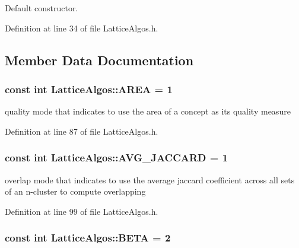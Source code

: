 Default constructor. 



Definition at line 34 of file LatticeAlgos.h.



\subsection{Member Data Documentation}
\hypertarget{class_lattice_algos_a0a79ddaab00906dea5756ac05a4861a5}{
\subsubsection[{AREA}]{\setlength{\rightskip}{0pt plus 5cm}const int {\bf LatticeAlgos::AREA} = 1}}
\label{class_lattice_algos_a0a79ddaab00906dea5756ac05a4861a5}


quality mode that indicates to use the area of a concept as its quality measure 



Definition at line 87 of file LatticeAlgos.h.

\hypertarget{class_lattice_algos_a24156b300d4b23d0d618f548091d0aeb}{
\subsubsection[{AVG\_\-JACCARD}]{\setlength{\rightskip}{0pt plus 5cm}const int {\bf LatticeAlgos::AVG\_\-JACCARD} = 1}}
\label{class_lattice_algos_a24156b300d4b23d0d618f548091d0aeb}


overlap mode that indicates to use the average jaccard coefficient across all sets of an n-\/cluster to compute overlapping 



Definition at line 99 of file LatticeAlgos.h.

\hypertarget{class_lattice_algos_a3cf765cdc6bce759203597708324ee9e}{
\subsubsection[{BETA}]{\setlength{\rightskip}{0pt plus 5cm}const int {\bf LatticeAlgos::BETA} = 2}}
\label{class_lattice_algos_a3cf765cdc6bce759203597708324ee9e}


